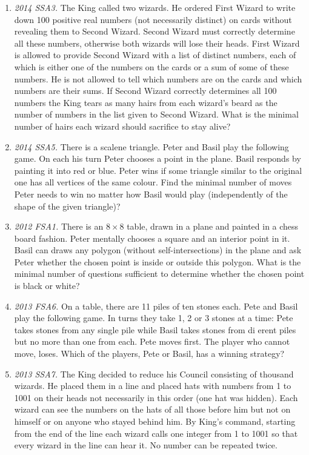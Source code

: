 \documentclass[11pt,a4paper]{article}
\begin{document}
\begin{enumerate}
\item\emph {2014 SSA3.} The King called two wizards.  He ordered First Wizard to write down 100 positive real
numbers (not necessarily distinct) on cards without revealing them to Second Wizard.
Second  Wizard  must  correctly  determine  all  these  numbers,  otherwise  both  wizards
will lose their heads.  First Wizard is allowed to provide Second Wizard with a list of
distinct numbers, each of which is either one of the numbers on the cards or a sum of
some of these numbers.  He is not allowed to tell which numbers are on the cards and
which numbers are their sums.  If Second Wizard correctly determines all 100 numbers
the King tears as many hairs from each wizard's beard as the number of numbers in
the list given to Second Wizard.  What is the minimal number of hairs each wizard
should sacrifice to stay alive?

\item\emph {2014 SSA5.} There  is  a  scalene  triangle.   Peter  and  Basil  play  the  following  game.   On  each  his
turn  Peter  chooses  a  point  in  the  plane.   Basil  responds  by  painting  it  into  red  or
blue.  Peter wins if some triangle similar to the original one has all vertices of the same
colour.  Find the minimal number of moves Peter needs to win no matter how Basil
would play (independently of the shape of the given triangle)?

\item\emph {2012 FSA1.} There is an $8\times 8$ table, drawn in a plane and painted in a chess board fashion.
Peter mentally chooses a square and an interior point in it.  Basil can draws
any polygon (without self-intersections) in the plane and ask Peter whether the
chosen point is inside or outside this polygon.  What is the minimal number of
questions sufficient to determine whether the chosen point is black or white?

\item\emph {2013 FSA6.} On  a  table,  there  are  11  piles  of  ten  stones  each.   Pete  and  Basil  play  the following game.  In turns they take 1, 2 or 3 stones at a time:  Pete takes stones from any single pile while Basil takes stones from di erent piles but no more than one from each.  Pete moves  first.  The player who cannot move, loses. Which of the players, Pete or Basil, has a winning strategy?

\item\emph {2013 SSA7.} The King decided to reduce his Council consisting of thousand wizards.  He placed them in a
line and placed hats with numbers from 1 to 1001 on their heads not necessarily in this order (one
hat was hidden).  Each wizard can see the numbers on the hats of all those before him but not on
himself or on anyone who stayed behind him.  By King's command, starting from the end of the
line each wizard calls one integer from 1 to 1001 so that every wizard in the line can hear it.  No
number can be repeated twice.


\end{enumerate}
\end{document}
